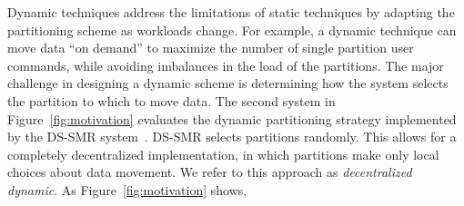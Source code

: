 Dynamic techniques address the limitations of static techniques by adapting
the partitioning scheme as workloads change.  
For example, a dynamic technique can move data ``on demand'' to maximize the number of single partition user commands, while avoiding imbalances in the load of the partitions.  
The major challenge in designing a dynamic
scheme is determining how the system selects the partition to which to
move data.
%
The second system in Figure~\ref{fig:motivation} evaluates the dynamic
partitioning strategy implemented by the DS-SMR system~\cite{hoang2016}.
DS-SMR selects partitions randomly. This allows for a completely 
decentralized implementation, in which partitions make only local
choices about data movement.  We refer to this approach as
\emph{decentralized dynamic}.  As Figure~\ref{fig:motivation} shows,
